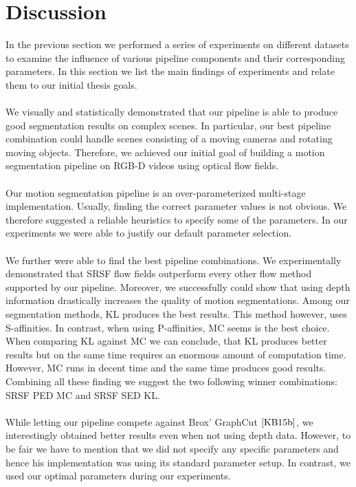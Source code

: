 \section{Discussion}
\label{sec:discussion}
In the previous section we performed a series of experiments on different datasets to examine the influence of various pipeline components and their corresponding parameters. In this section we list the main findings of experiments and relate them to our initial thesis goals. \\ \\
We visually and statistically demonstrated that our pipeline is able to produce good segmentation results on complex scenes. In particular, our best pipeline combination could handle scenes consisting of a moving cameras and rotating moving objects. Therefore, we achieved our initial goal of building a motion segmentation pipeline on RGB-D videos using optical flow fields. \\ \\
Our motion segmentation pipeline is an over-parameterized multi-stage implementation. Usually, finding the correct parameter values is not obvious. We therefore suggested a reliable heuristics to specify some of the parameters. In our experiments we were able to justify our default parameter selection. \\ \\
We further were able to find the best pipeline combinations. We experimentally demonstrated that SRSF flow fields outperform every other flow method supported by our pipeline. Moreover, we successfully could show that using depth information drastically increases the quality of motion segmentations. Among our segmentation methods, KL produces the best results. This method however, uses S-affinities. In contrast, when using P-affinities, MC seems is the best choice. When comparing KL against MC we can conclude, that KL produces better results but on the same time requires an enormous amount of computation time. However, MC runs in decent time and the same time produces good results. Combining all these finding we suggest the two following winner combinations: SRSF PED MC and SRSF SED KL. \\ \\
While letting our pipeline compete against Brox' GraphCut $\cite{KB15b}$, we interestingly obtained better results even when not using depth data. However, to be fair we have to mention that we did not specify any specific parameters and hence his implementation was using its standard parameter setup. In contrast, we used our optimal parameters during our experiments.
